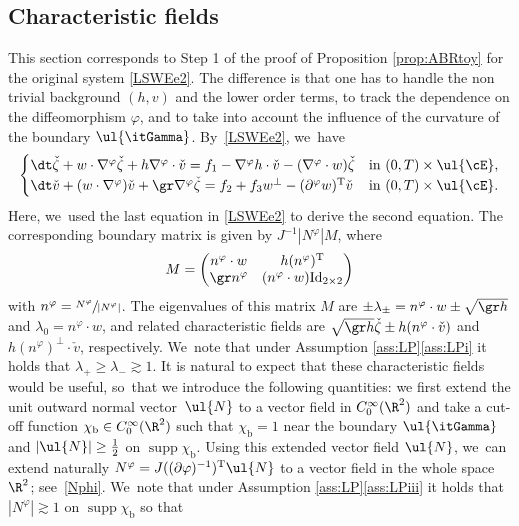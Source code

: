 \subsection{Characteristic fields}
This section corresponds to Step 1 of the proof of Proposition \ref{prop:ABRtoy} for the original system \eqref{LSWEe2}.
The difference is that one has to handle the non trivial background $(h,v)$ and the lower order terms, to track the dependence on the diffeomorphism $\varphi$,
and to take into account the influence of the curvature of the boundary $\ul{\itGamma}$. By~\eqref{LSWEe2}, we~have
\begin{equation}\label{LSWEe5}
\begin{cases}
\dt\check{\zeta}+w\cdot\nabla^\varphi\check{\zeta}+h\nabla^\varphi\cdot\check{v} = f_1-\nabla^\varphi h\cdot\check{v}-(\nabla^\varphi\cdot w)\check{\zeta}
&\text{in } (0,T)\times\ul{\cE}, \\
\dt\check{v}+(w\cdot\nabla^\varphi)\check{v}+\gr\nabla^\varphi\check{\zeta} = f_2 + f_3w^\perp-(\partial^\varphi w)^\mathrm{T}\check{v}
&\text{in } (0,T)\times\ul{\cE}. \\
\end{cases}
\end{equation}
Here, we~used the last equation in \eqref{LSWEe2} to derive the second equation.
The corresponding boundary matrix is given by $J^{-1}|N^\varphi| M$, where
\[
M =
\begin{pmatrix}
n^\varphi\cdot w & h(n^\varphi)^\mathrm{T} \\
\gr n^\varphi & (n^\varphi\cdot w)\mathrm{Id}_{2\times2}
\end{pmatrix}
\]
with $n^\varphi = \sfrac{N^\varphi}{|N^\varphi|}$.
The eigenvalues of this matrix $M$ are $\pm\lambda_{\pm}=n^\varphi\cdot w \pm \sqrt{\gr h}$ and $\lambda_0=n^\varphi\cdot w$, and related characteristic fields are
$\sqrt{\gr h}\check{\zeta}\pm h(n^\varphi\cdot\check{v})$ and $h(n^\varphi)^\perp\cdot\check{v}$, respectively. We~note that under Assumption \ref{ass:LP}\eqref{ass:LPi} it holds that $\lambda_+\geq\lambda_-\gtrsim1$.
It is natural to expect that these characteristic fields would be useful, so~that we introduce the following quantities:
we first extend the unit outward normal vector~$\ul{N}$ to a vector field in $C_0^\infty(\R^2)$ and take a cut-off function $\chi_\mathrm{b}\in C_0^\infty(\R^2)$
such that $\chi_\mathrm{b}=1$ near the boundary $\ul{\itGamma}$ and $|\ul{N}|\geq\frac12$ on $\operatorname{supp}\chi_\mathrm{b}$.
Using this extended vector field $\ul{N}$, we~can extend naturally $N^\varphi=J((\partial\varphi)^{-1})^\mathrm{T}\ul{N}$ to a vector field in the whole space $\R^2$; see~\eqref{Nphi}. We~note that under Assumption \ref{ass:LP}\eqref{ass:LPiii} it holds that $|N^\varphi| \gtrsim 1$ on $\operatorname{supp}\chi_\mathrm{b}$ so that
